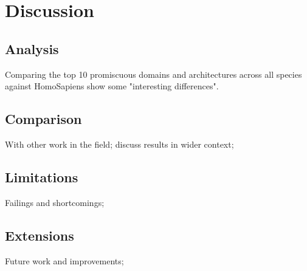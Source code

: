 \section{Discussion}
% 

\subsection{Analysis}
Comparing the top 10 promiscuous domains and architectures across all species against HomoSapiens show some "interesting differences".

\subsection{Comparison}
With other work in the field; discuss results in wider context;

\subsection{Limitations}
Failings and shortcomings;

\subsection{Extensions}
Future work and improvements;

